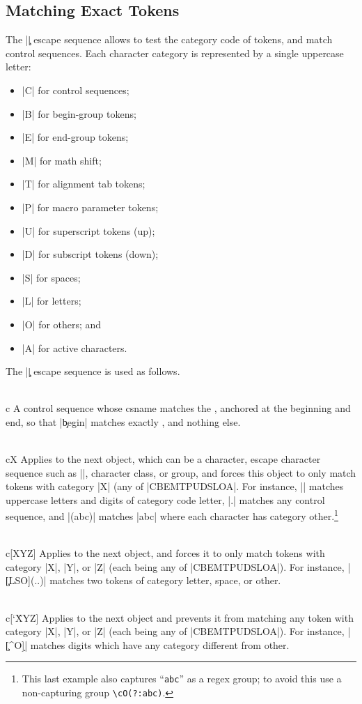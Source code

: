 \documentclass[oneside]{book}
\begin{document}
\subsection{Matching Exact Tokens}

The |\c| escape sequence allows to test the category code of tokens,
and match control sequences. Each character category is represented
by a single uppercase letter:
\begin{itemize}
\item |C| for control sequences;
\item |B| for begin-group tokens;
\item |E| for end-group tokens;
\item |M| for math shift;
\item |T| for alignment tab tokens;
\item |P| for macro parameter tokens;
\item |U| for superscript tokens (up);
\item |D| for subscript tokens (down);
\item |S| for spaces;
\item |L| for letters;
\item |O| for others; and
\item |A| for active characters.
\end{itemize}
The |\c| escape sequence is used as follows.
\begin{l3regex-syntax}
  \item[\\c\Arg{regex}] A control sequence whose csname matches the
    , anchored at the beginning and end, so that |\c{begin}|
    matches exactly , and nothing else.
  \item[\\cX] Applies to the next object, which can be a character,
    escape character sequence such as ||, character class, or
    group, and forces this object to only match tokens with category
    |X| (any of |CBEMTPUDSLOA|. For instance, |\cL[A-Z\d]| matches
    uppercase letters and digits of category code letter, |\cC.|
    matches any control sequence, and |\cO(abc)| matches |abc| where
    each character has category other.\footnote{This last example also
    captures \enquote{\texttt{abc}} as a regex group; to avoid this
    use a non-capturing group \texttt{\textbackslash cO(?:abc)}.}
  \item[{\\c[XYZ]}] Applies to the next object, and forces it to only
    match tokens with category |X|, |Y|, or |Z| (each being any of
    |CBEMTPUDSLOA|). For instance, |\c[LSO](..)| matches two tokens of
    category letter, space, or other.
  \item[{\\c[\char`\^XYZ]}] Applies to the next object and prevents it
    from matching any token with category |X|, |Y|, or |Z| (each being
    any of |CBEMTPUDSLOA|). For instance, |\c[^O]\d| matches digits
    which have any category different from other.
\end{l3regex-syntax}
\end{document}
